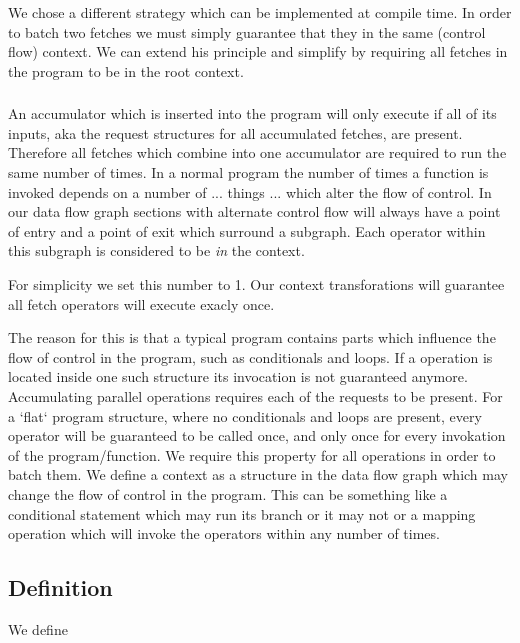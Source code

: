 We chose a different strategy which can be implemented at compile time.
In order to batch two fetches we must simply guarantee that they in the same (control flow) context.
We can extend his principle and simplify by requiring all fetches in the program to be in the root context.

\subsubsection{}

An accumulator which is inserted into the program will only execute if all of its inputs, aka the request structures for all accumulated fetches, are present.
Therefore all fetches which combine into one accumulator are required to run the same number of times.
In a normal program the number of times a function is invoked depends on a number of ... things ... which alter the flow of control.
In our data flow graph sections with alternate control flow will always have a point of entry and a point of exit which surround a subgraph.
Each operator within this subgraph is considered to be \textit{in} the context.


For simplicity we set this number to 1.
Our context transforations will guarantee all fetch operators will execute exacly once.


The reason for this is that a typical program contains parts which influence the flow of control in the program, such as conditionals and loops.
If a \fetch{} operation is located inside one such structure its invocation is not guaranteed anymore.
Accumulating parallel \fetch{} operations requires each of the requests to be present.
For a `flat` program structure, where no conditionals and loops are present, every operator will be guaranteed to be called once, and only once for every invokation of the program/function.
We require this property for all \fetch{} operations in order to batch them.
We define a context as a structure in the data flow graph which may change the flow of control in the program.
This can be something like a conditional statement which may run its branch or it may not or a mapping operation which will invoke the operators within any number of times.


\subsection{Definition}

We define

